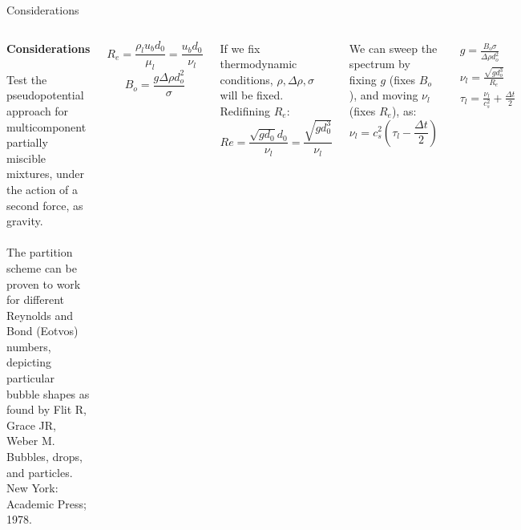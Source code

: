 \documentclass[9pt]{beamer}
\begin{document}
	\begin{frame}[t]{Considerations}
		\justifying
		
		
		\begin{columns}[t]
			
			\textbf{Considerations}\\~\\
			\justifying
			Test the pseudopotential approach for multicomponent partially miscible mixtures, under the action of a second force, as gravity.\\~\\
			
			The partition scheme can be proven to work for different Reynolds and Bond (Eotvos) numbers, depicting particular bubble shapes as found by Flit R, Grace JR, Weber M. Bubbles, drops, and particles. New York: Academic Press; 1978. 
			
			\begin{equation*}
			R_e = \frac{\rho_l u_b d_0}{\mu_l} = \frac{u_b d_0}{\nu_l}
			\end{equation*}
			\begin{equation*}
			B_o = \frac{g \Delta \rho d_o^2}{\sigma}
			\end{equation*}
			
			
			If we fix thermodynamic conditions, $\rho, \Delta \rho, \sigma$ will be fixed. Redifining $R_e$:
			\begin{equation*}
				Re = \frac{\sqrt{g d_0} d_0}{\nu_l} =  \frac{\sqrt{g d_0^3}}{\nu_l}
			\end{equation*}
			
			We can sweep the spectrum by fixing $g$ (fixes $B_o$), and moving $\nu_l$ (fixes $R_e$), as:
			\begin{equation*}
				\nu_l = c_s^2 (\tau_l - \frac{\Delta t}{2})
			\end{equation*}
				
			\begin{equation*}
				\begin{split}
					g = \frac{B_o \sigma}{\Delta \rho d_o^2}\\
					\nu_l = \frac{\sqrt{g d_o^3}}{R_e}\\
					\tau_l = \frac{\nu_l}{c_s^2}+ \frac{\Delta t}{2}
				\end{split}
			\end{equation*}
		\end{columns}
	\end{frame}
	
\end{document}
